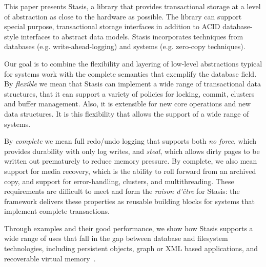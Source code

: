 \documentclass[letterpaper,twocolumn,10pt]{article}
\newcommand{\yad}{Stasis\xspace}
\newcommand{\eat}[1]{}
\begin{document}
\eat{
Examples of real world systems that currently fall into this category
are web search engines, document repositories, large-scale web-email
services, map and trip planning services, ticket reservation systems,
photo and video repositories, bioinformatics, version control systems,
work-flow applications, CAD/VLSI applications and directory services.

In short, we believe that a fundamental architectural shift in
transactional storage is necessary before general purpose storage
systems are of practical use to modern applications.
Until this change occurs, databases' imposition of unwanted
abstraction upon their users will restrict system designs and
implementations.
}

This paper presents \yad, a library that provides transactional
storage at a level of abstraction as close to the hardware as
possible.  The library can support special purpose, transactional
storage interfaces in addition to ACID database-style interfaces to
abstract data models.  \yad incorporates techniques from databases
(e.g. write-ahead-logging) and systems (e.g. zero-copy techniques).

Our goal is to combine the flexibility and layering of low-level
abstractions typical for systems work with the complete semantics
that exemplify the database field.
By {\em flexible} we mean that \yad{}  can implement a wide
range of transactional data structures, that it can support a variety
of policies for locking, commit, clusters and buffer management.
Also, it is extensible for new core operations
and new data structures. It is this flexibility that allows the
support of a wide range of systems.

By {\em complete} we mean full redo/undo logging that supports
both {\em no force}, which provides durability with only log writes,
and {\em steal}, which allows dirty pages to be written out prematurely
to reduce memory pressure. By complete, we also
mean support for media recovery, which is the ability to roll
forward from an archived copy, and support for error-handling,
clusters, and multithreading. These requirements are difficult
to meet and form the {\em raison d'\^etre} for \yad{}: the framework
delivers these properties as reusable building blocks for systems
that implement complete transactions.

Through examples and their good performance, we show how \yad{}
supports a wide range of uses that fall in the gap between 
database and filesystem technologies, including
persistent objects, graph or XML based applications, and recoverable
virtual memory~\cite{lrvm}.  
\end{document}
